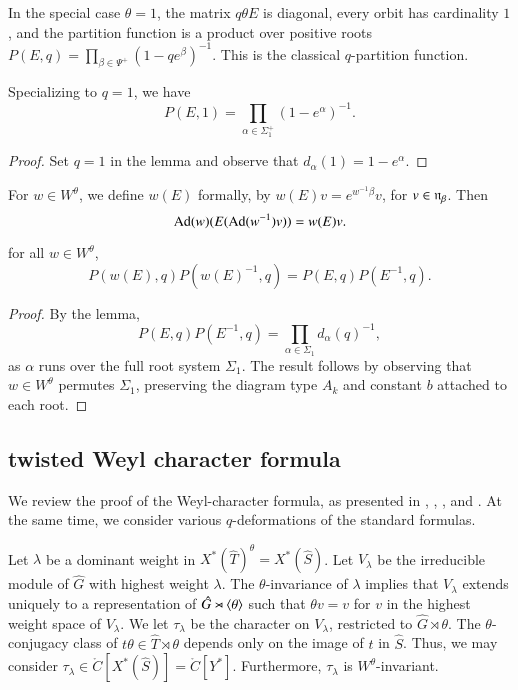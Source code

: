 In the special case $\theta=1$, the matrix $q \theta E$ is diagonal,
every orbit has cardinality $1$, and the partition function is a
product over positive roots $P(E,q) = \prod_{\beta\in\Psi^+} (1- q
e^\beta)^{-1}$.  This is the classical $q$-partition function.

\begin{corollary}\label{cor:prod1} 
Specializing to $q=1$, we have
\[
P(E,1) = \prod_{\alpha\in\Sigma^+_1} (1-e^{\alpha})^{-1}.
\]
\end{corollary}

\begin{proof}  
Set $q=1$ in the lemma and observe that $d_\alpha(1)=1-e^\alpha$.
\end{proof}

For $w\in W^\theta$, we define $w(E)$ formally, by $w(E) v = e^{
  w^{-1} \beta} v$, for $v\in {\mathfrak n}_\beta$.  Then
\[
{\operatorname{Ad}}(w)(E({\operatorname{Ad}}(w^{-1}) v)) = w(E) v.
\] 

\begin{corollary}\label{cor:weyl-p}  
for all $w\in W^\theta$,
\[
P(w(E),q) P(w(E)^{-1},q) = P(E,q)P(E^{-1},q).
\]
\end{corollary}

\begin{proof} 
By the lemma,
\[
P(E,q)P(E^{-1},q) = \prod_{\alpha\in \Sigma_1} d_{\alpha}(q)^{-1},
\]
as $\alpha$ runs over the full root system $\Sigma_1$.  The result
follows by observing that $w\in W^\theta$ permutes $\Sigma_1$,
preserving the diagram type $A_k$ and constant $b$ attached to each
root.
\end{proof}



\subsection{twisted Weyl character formula}

We review the proof of the Weyl-character formula, as presented in
\cite{kostant1961lie}, \cite{jantzen1977darstellungen},
\cite{wendt2001weyl}, and \cite{kumar2009characters}.  At the same
time, we consider various $q$-deformations of the standard formulas.

Let $\lambda$ be a dominant weight in $X^*(\hat T)^\theta = X^*(\hat
S)$.  Let $V_\lambda$ be the irreducible module of $\hat G$ with
highest weight $\lambda$.  The $\theta$-invariance of $\lambda$
implies that $V_\lambda$ extends uniquely to a representation of $\hat
G \rtimes \langle{\theta}\rangle$ such that $\theta v = v$ for $v$ in the
highest weight space of $V_\lambda$.  We let $\tau_\lambda$ be the
character on $V_\lambda$, restricted to $\hat G\rtimes\theta$.   The
$\theta$-conjugacy class of $t\theta\in \hat T\rtimes\theta$ depends
only on the image of $t$ in $\hat S$.  Thus, we may consider
$\tau_\lambda\in \ring{C}[X^*(\hat S)] =\ring{C}[Y^*]$.  Furthermore,
$\tau_\lambda$ is $W^\theta$-invariant.

